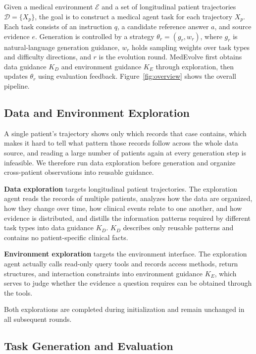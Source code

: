 \documentclass[11pt]{article}
\begin{document}
Given a medical environment $\mathcal{E}$ and a set of longitudinal patient trajectories $\mathcal{D}=\{X_p\}$, the goal is to construct a medical agent task for each trajectory $X_p$. Each task consists of an instruction $q$, a candidate reference answer $a$, and source evidence $e$. Generation is controlled by a strategy $\theta_r=(g_r,w_r)$, where $g_r$ is natural-language generation guidance, $w_r$ holds sampling weights over task types and difficulty directions, and $r$ is the evolution round. MedEvolve first obtains data guidance $K_D$ and environment guidance $K_E$ through exploration, then updates $\theta_r$ using evaluation feedback. Figure~\ref{fig:overview} shows the overall pipeline.

\subsection{Data and Environment Exploration}

A single patient's trajectory shows only which records that case contains, which makes it hard to tell what pattern those records follow across the whole data source, and reading a large number of patients again at every generation step is infeasible. We therefore run data exploration before generation and organize cross-patient observations into reusable guidance.

\textbf{Data exploration} targets longitudinal patient trajectories. The exploration agent reads the records of multiple patients, analyzes how the data are organized, how they change over time, how clinical events relate to one another, and how evidence is distributed, and distills the information patterns required by different task types into data guidance $K_D$. $K_D$ describes only reusable patterns and contains no patient-specific clinical facts.

\textbf{Environment exploration} targets the environment interface. The exploration agent actually calls read-only query tools and records access methods, return structures, and interaction constraints into environment guidance $K_E$, which serves to judge whether the evidence a question requires can be obtained through the tools.

Both explorations are completed during initialization and remain unchanged in all subsequent rounds.

\subsection{Task Generation and Evaluation}
\end{document}
